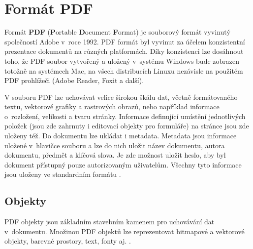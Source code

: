 \chapter{Formát PDF}
Formát \textbf{PDF} (\textbf{P}ortable \textbf{D}ocument \textbf{F}ormat) je souborový formát vyvinutý společností Adobe v~roce 1992. PDF formát byl vyvinut za účelem konzistentní prezentace dokumentů na různých platformách. Díky konzistenci lze dosáhnout toho, že PDF soubor vytvořený a uložený v~systému Windows bude zobrazen totožně na systémech Mac, na všech distribucích Linuxu nezávisle na použitém PDF prohlížeči (Adobe Reader, Foxit a další).
\par 
V souboru PDF lze uchovávat velice širokou škálu dat, včetně formátovaného textu, vektorové grafiky a rastrových obrazů, nebo například informace o~rozložení, velikosti a tvaru stránky. Informace definující umístění jednotlivých položek (jsou zde zahrnuty i editovací objekty pro formuláře) na stránce jsou zde uloženy též. Do dokumentu lze ukládat i metadata. Metadata jsou informace uložené v~hlavičce souboru a lze do nich uložit název dokumentu, autora dokumentu, předmět a klíčová slova. Je zde možnost uložit heslo, aby byl dokument přístupný pouze autorizovaným uživatelům. Všechny tyto informace jsou uloženy ve standardním formátu \cite{PDFTechTerms, PDFWhatIs}.

\section{Objekty}
PDF objekty jsou základním stavebním kamenem pro uchovávání dat v~dokumentu. Množinou PDF objektů lze reprezentovat bitmapové a vektorové objekty, barevné prostory, text, fonty aj. \cite{PDFExplained}.
